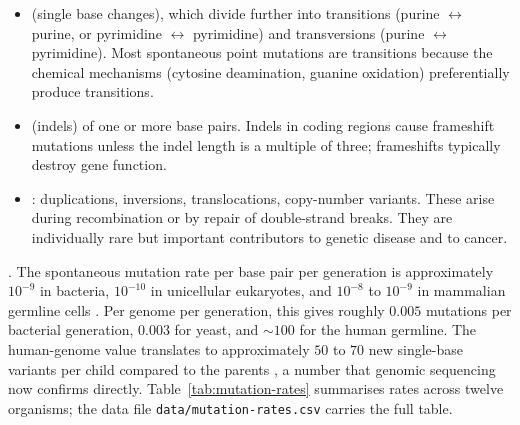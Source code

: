 \begin{itemize}[leftmargin=*]
\item {} (single base changes), which divide
  further into transitions (purine $\leftrightarrow$ purine, or
  pyrimidine $\leftrightarrow$ pyrimidine) and transversions (purine
  $\leftrightarrow$ pyrimidine). Most spontaneous point mutations are
  transitions because the chemical mechanisms (cytosine deamination,
  guanine oxidation) preferentially produce transitions.
\item {} (indels) of one or more
  base pairs. Indels in coding regions cause frameshift mutations
  unless the indel length is a multiple of three; frameshifts
  typically destroy gene function.
\item {}: duplications, inversions,
  translocations, copy-number variants. These arise during recombination
  or by repair of double-strand breaks. They are individually rare but
  important contributors to genetic disease and to cancer.
\end{itemize}

. The spontaneous mutation rate per base pair
per generation is approximately $10^{-9}$ in bacteria, $10^{-10}$ in
unicellular eukaryotes, and $10^{-8}$ to $10^{-9}$ in mammalian
germline cells \cite[ch.~25]{text:lehninger-biochemistry}. Per genome
per generation, this gives roughly $0.005$ mutations per bacterial
generation, $0.003$ for yeast, and $\sim 100$ for the human germline.
The human-genome value translates to approximately $50$ to $70$ new
single-base variants per child compared to the parents
\cite{paper:v6c03-kong-2012}, a number that genomic sequencing now
confirms directly. Table~\ref{tab:mutation-rates} summarises rates
across twelve organisms; the data file
\texttt{data/mutation-rates.csv} carries the full table.

